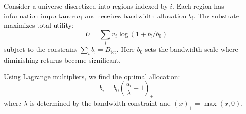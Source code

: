 \documentclass[12pt,letterpaper]{book}
\begin{document}
Consider a universe discretized into regions indexed by $i$. Each region has information importance $u_i$ and receives bandwidth allocation $b_i$. The substrate maximizes total utility:
\begin{equation}
U = \sum_i u_i \log(1 + b_i/b_0)
\end{equation}
subject to the constraint $\sum_i b_i = B_{\text{tot}}$. Here $b_0$ sets the bandwidth scale where diminishing returns become significant.

Using Lagrange multipliers, we find the optimal allocation:
\begin{equation}
b_i = b_0 \left( \frac{u_i}{\lambda} - 1 \right)_+
\end{equation}
where $\lambda$ is determined by the bandwidth constraint and $(x)_+ = \max(x,0)$.
\end{document}
